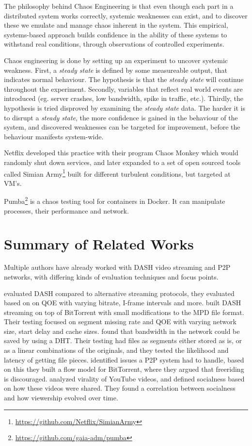 The philosophy behind Chaos Engineering is that even though each part in a distributed system works correctly, systemic weaknesses can exist, and to discover these we emulate and manage chaos inherent in the system. This empirical, systems-based approach builds confidence in the ability of these systems to withstand real conditions, through observations of controlled experiments.

Chaos engineering is done by setting up an experiment to uncover systemic weakness.
First, a \emph{steady state} is defined by some measureable output, that indicates normal behaviour. The hypothesis is that the \emph{steady state} will continue throughout the experiment.
Secondly, variables that reflect real world events are introduced (eg. server crashes, low bandwidth, spike in traffic, etc.).
Thirdly, the hypothesis is tried disproved by examining the \emph{steady state} data.
The harder it is to disrupt a \emph{steady state}, the more confidence is gained in the behaviour of the system, and discovered weaknesses can be targeted for improvement, before the behaviour manifests system-wide.

Netflix developed this practice with their program Chaos Monkey which would randomly shut down services, and later expanded to a set of open sourced tools called Simian Army\footnote{\url{https://github.com/Netflix/SimianArmy}} built for different turbulent conditions, but targeted at \ac{VM}'s.

Pumba\footnote{\url{https://github.com/gaia-adm/pumba}} is a chaos testing tool for containers in Docker. It can manipulate processes, their performance and network.

\section{Summary of Related Works}
Multiple authors have already worked with \ac{DASH} video streaming and \ac{P2P} networks, with differing kinds of evaluation techniques and focus points.

\citet{aloman2015performance} evaluated \ac{DASH} compared to alternative streaming protocols, they evaluated based on on \ac{QOE} with varying bitrate, I-frame intervals and more. \citet{gazdar2017toward} built \ac{DASH} streaming on top of BitTorrent with small modifications to the \ac{MPD} file format. Their testing focused on segment missing rate and \ac{QOE} with varying network size, start delay and cache sizes. \citet{nguyen2009p2p} found that bandwidth in the network could be saved by using a \ac{DHT}. Their testing had files as segments either stored as is, or as a linear combinations of the originals, and they tested the likelihood and latency of getting file pieces. \citet{qiu2004modeling} identified issues a \ac{P2P} system had to handle, based on this they built a flow model for BitTorrent, where they argued that freeriding is discouraged. \citet{broxton2013catching} analyzed virality of YouTube videos, and defined socialness based on how these videos were shared. They found a correlation between socialness and how viewership evolved over time.

